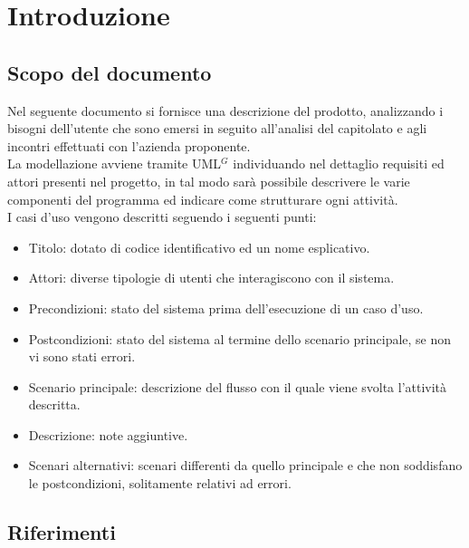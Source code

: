 \section{Introduzione}

\subsection{Scopo del documento}
Nel seguente documento si fornisce una descrizione del prodotto, analizzando i bisogni dell'utente che sono emersi in seguito all'analisi del capitolato e agli incontri effettuati con l'azienda proponente. \\
La modellazione avviene tramite UML$^G$ individuando nel dettaglio requisiti ed attori presenti nel progetto, in tal modo sarà possibile descrivere le varie componenti del programma ed indicare come strutturare ogni attività. \\

\noindent
I casi d'uso vengono descritti seguendo i seguenti punti:
\begin{itemize}
	\item Titolo: dotato di codice identificativo ed un nome esplicativo.
	\item Attori: diverse tipologie di utenti che interagiscono con il sistema.
	\item Precondizioni: stato del sistema prima dell'esecuzione di un caso d'uso.
	\item Postcondizioni: stato del sistema al termine dello scenario principale, se non vi sono stati errori.
	\item Scenario principale: descrizione del flusso con il quale viene svolta l'attività descritta.
	\item Descrizione: note aggiuntive.
	\item Scenari alternativi: scenari differenti da quello principale e che non soddisfano le postcondizioni, solitamente relativi ad errori.
\end{itemize}

\subsection{Riferimenti}
